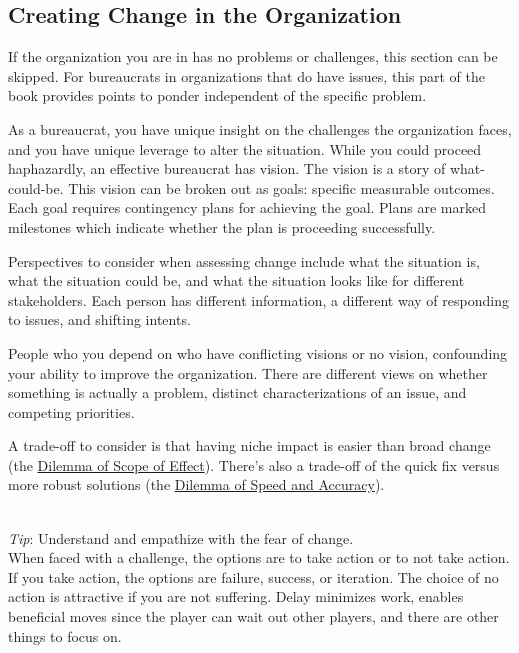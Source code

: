 \subsection*{Creating Change in the Organization\label{sec:creating-change}}

If the organization you are in has no problems or challenges, this section can be skipped. For bureaucrats in organizations that do have issues, this part of the book provides points to ponder independent of the specific problem.

As a bureaucrat, you have unique insight on the challenges the organization faces, and you have unique leverage to alter the situation.  While you could proceed haphazardly, an effective bureaucrat has vision. The vision is a story of what-could-be. This vision can be broken out as goals: specific measurable outcomes. Each goal requires contingency plans for achieving the goal. Plans are marked milestones which indicate whether the plan is proceeding successfully. 

Perspectives to consider when assessing change include what the situation is, what the situation could be, and what the situation looks like for different stakeholders. Each person has different information, a different way of responding to issues, and shifting intents.

People who you depend on who have conflicting visions or no vision, confounding your ability to improve the organization. There are different views on whether something is actually a problem, distinct characterizations of an issue, and competing priorities.

A trade-off to consider is that having niche impact is easier than broad change (the \hyperref[table:dilemma-personal-scope-broad-vs-narrow]{Dilemma of Scope of Effect}). 
There's also a trade-off of the quick fix versus more robust solutions (the \hyperref[table:dilemma-personal-quick-methodical]{Dilemma of Speed and Accuracy}).




\ \\
\textit{Tip}: Understand and empathize with the fear of change. \\
When faced with a challenge, the options are to take action or to not take action. If you take action, the options are failure, success, or iteration. 
The choice of no action is attractive if you are not suffering. Delay minimizes work, enables beneficial moves since the player can wait out other players, and there are other things to focus on.

